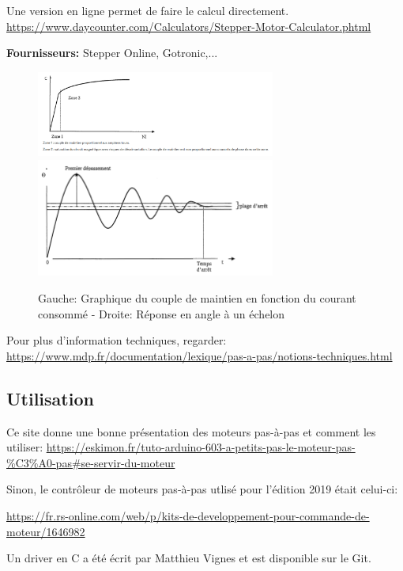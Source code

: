 \documentclass[a4paper, 11pt]{report}
\begin{document}
Une version en ligne permet de faire le calcul directement.
\url{https://www.daycounter.com/Calculators/Stepper-Motor-Calculator.phtml}

\textbf{Fournisseurs:} Stepper Online, Gotronic,...

\begin{figure}
\begin{centering}
\caption{Gauche: Graphique du couple de maintien en fonction du courant consommé - Droite: Réponse en angle à un échelon}
\includegraphics[width=0.7\textwidth]{images/CoupleMaintien.png}
\includegraphics[width=0.7\textwidth]{images/reponse_indicielleMPP.png}
\par\end{centering}
\end{figure}

Pour plus d'information techniques, regarder: \url{https://www.mdp.fr/documentation/lexique/pas-a-pas/notions-techniques.html}

\subsection{Utilisation}

Ce site donne une bonne présentation des moteurs pas-à-pas et comment les utiliser: \url{https://eskimon.fr/tuto-arduino-603-a-petits-pas-le-moteur-pas-\%C3\%A0-pas#se-servir-du-moteur}

Sinon, le contrôleur de moteurs pas-à-pas utlisé pour l'édition 2019 était celui-ci:

\url{https://fr.rs-online.com/web/p/kits-de-developpement-pour-commande-de-moteur/1646982}

Un driver en C a été écrit par Matthieu Vignes et est disponible sur le Git.
\end{document}
